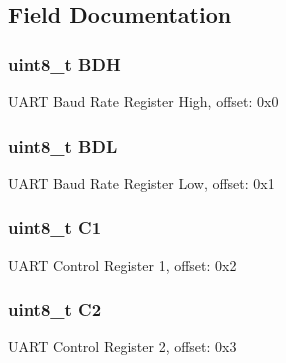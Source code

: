 \subsection{Field Documentation}
\hypertarget{struct_u_a_r_t0___mem_map_a98dc87068e86db23707f3f5d6192108c}{}
\subsubsection[{B\+D\+H}]{\setlength{\rightskip}{0pt plus 5cm}uint8\+\_\+t B\+D\+H}\label{struct_u_a_r_t0___mem_map_a98dc87068e86db23707f3f5d6192108c}
U\+A\+R\+T Baud Rate Register High, offset\+: 0x0 \hypertarget{struct_u_a_r_t0___mem_map_ae31ec5a78a5d91e855af347b60fee8b8}{}
\subsubsection[{B\+D\+L}]{\setlength{\rightskip}{0pt plus 5cm}uint8\+\_\+t B\+D\+L}\label{struct_u_a_r_t0___mem_map_ae31ec5a78a5d91e855af347b60fee8b8}
U\+A\+R\+T Baud Rate Register Low, offset\+: 0x1 \hypertarget{struct_u_a_r_t0___mem_map_a8286c9d870f31a089d95e6a2285fbe2f}{}
\subsubsection[{C1}]{\setlength{\rightskip}{0pt plus 5cm}uint8\+\_\+t C1}\label{struct_u_a_r_t0___mem_map_a8286c9d870f31a089d95e6a2285fbe2f}
U\+A\+R\+T Control Register 1, offset\+: 0x2 \hypertarget{struct_u_a_r_t0___mem_map_acdf8ac8ab339152eaed13f4eca300aa5}{}
\subsubsection[{C2}]{\setlength{\rightskip}{0pt plus 5cm}uint8\+\_\+t C2}\label{struct_u_a_r_t0___mem_map_acdf8ac8ab339152eaed13f4eca300aa5}
U\+A\+R\+T Control Register 2, offset\+: 0x3 \hypertarget{struct_u_a_r_t0___mem_map_a328e95cb4deb2dd724cb8b26a5ab381b}{}
